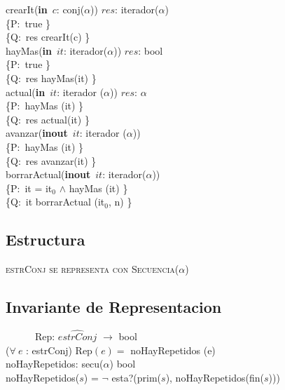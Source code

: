 \documentclass[a4paper,10pt]{article}
\newcommand{\sombrero}{\widehat}
\begin{document}
\noindent crearIt(\textbf{in}\ $c$: conj($\alpha$))  \en $res$: iterador($\alpha$) \ \ \ \ \ \\
\indent \{P:\ true \}  \\
\indent \{Q:\ res \igobs crearIt(c) \}\\

\noindent hayMas(\textbf{in}\ $it$: iterador($\alpha$))  \en $res$: bool \ \ \ \ \ \\
\indent \{P:\ true \}  \\
\indent \{Q:\ res \igobs hayMas(it) \}\\

\noindent actual(\textbf{in}\ $it$: iterador ($\alpha$))  \en $res$: $\alpha$ \ \ \ \ \ \\
\indent \{P:\ hayMas (it) \}  \\
\indent \{Q:\ res \igobs actual(it) \}\\

\noindent avanzar(\textbf{inout}\ $it$: iterador ($\alpha$)) \ \ \ \ \ \\
\indent \{P:\ hayMas (it) \}  \\
\indent \{Q:\ res \igobs avanzar(it) \}\\

\noindent borrarActual(\textbf{inout}\ $it$: iterador($\alpha$)) \ \ \ \ \ \\
\indent \{P:\ it = it$_0$ $\wedge$ hayMas (it) \}  \\
\indent \{Q:\ it \igobs borrarActual (it$_0$, n) \}\\

\newpage
\subsection{Estructura}

    \noindent \textsc{estrConj se representa con Secuencia($\alpha$)}


\subsection{Invariante de Representacion}

    \indent \ \ \ \ \ \ Rep: $\sombrero{estrConj}$ $\rightarrow$ bool \\
    
($\forall\ e$ : estrConj) Rep$(e) =$ noHayRepetidos (e) \\

noHayRepetidos: secu($\alpha$) \en bool\\
	\indent noHayRepetidos($s$) = $\neg$ esta?(prim($s$), noHayRepetidos(fin($s$)))  \\    
\end{document}
